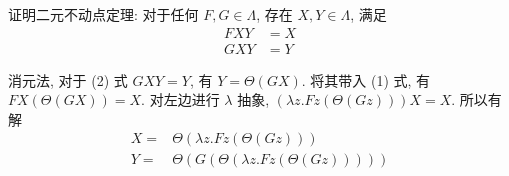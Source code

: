 \begin{problem}
证明二元不动点定理: 对于任何 $F, G \in \Lambda$, 存在 $X, Y \in \Lambda$, 满足
\begin{align}
F X Y & = X \\
G X Y & = Y
\end{align}
\end{problem}

\begin{solution}
消元法, 对于 (2) 式 $GXY = Y$, 有 $Y = \Theta (G X)$. 将其带入 (1) 式, 有 $F X (\Theta (G X)) = X$. 对左边进行 $\lambda$ 抽象, $(\lambda z. F z (\Theta (G z))) X = X$. 所以有解
\begin{align*}
    X = & \Theta (\lambda z. F z (\Theta (G z))) \\
    Y = & \Theta (G (\Theta (\lambda z. F z (\Theta (G z)))))
\end{align*}
\end{solution}
